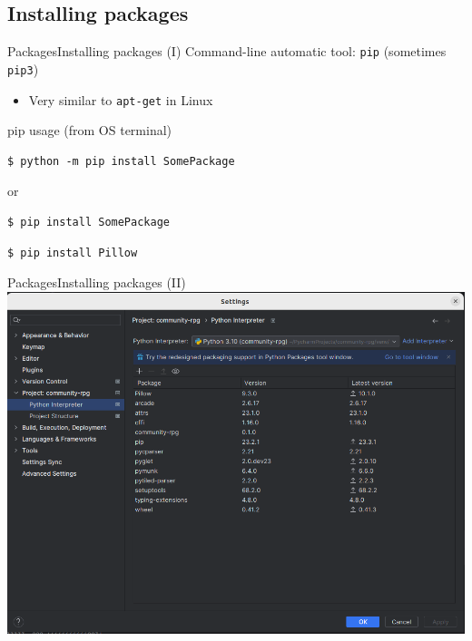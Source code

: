 \documentclass[10pt,compress]{beamer} %
\begin{document}
\subsection{Installing packages}
\begin{frame}[fragile]{Packages}{Installing packages (I)}
	Command-line automatic tool: \texttt{pip} (sometimes \texttt{pip3})
		\begin{itemize}
			\item Very similar to \texttt{apt-get} in Linux
		\end{itemize}

	\begin{block}{pip usage (from OS terminal)}
	\vspace{-0.2cm}
	\begin{verbatim}
$ python -m pip install SomePackage
\end{verbatim}

or
	\begin{verbatim}
$ pip install SomePackage
\end{verbatim}
	\vspace{-0.2cm}
\end{block}

	\begin{exampleblock}{}
	\vspace{-0.2cm}
	\begin{verbatim}
$ pip install Pillow
\end{verbatim}
	\vspace{-0.2cm}
\end{exampleblock}
\end{frame}

\begin{frame}[fragile]{Packages}{Installing packages (II)}
	    \includegraphics[width=0.8\linewidth]{figs/packages}
\end{frame}
\end{document}
